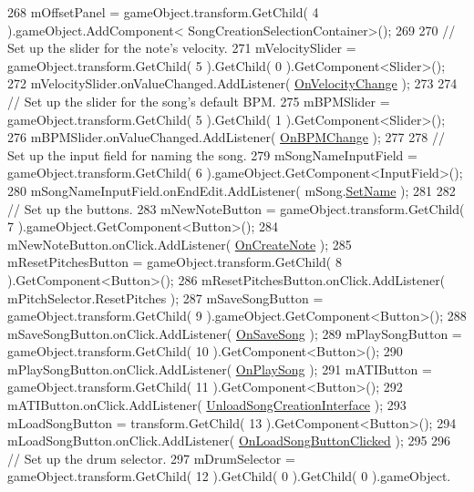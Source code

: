 \begin{DoxyCodeInclude}
268         mOffsetPanel = gameObject.transform.GetChild( 4 ).gameObject.AddComponent<
      SongCreationSelectionContainer>();
269 
270         \textcolor{comment}{// Set up the slider for the note's velocity.}
271         mVelocitySlider = gameObject.transform.GetChild( 5 ).GetChild( 0 ).GetComponent<Slider>();
272         mVelocitySlider.onValueChanged.AddListener( \hyperlink{group___s_c_m_handlers_ga45e79bb31be34e3e2cc47bd6a6563b40}{OnVelocityChange} );
273 
274         \textcolor{comment}{// Set up the slider for the song's default BPM.}
275         mBPMSlider = gameObject.transform.GetChild( 5 ).GetChild( 1 ).GetComponent<Slider>();
276         mBPMSlider.onValueChanged.AddListener( \hyperlink{group___s_c_m_handlers_gae5930497314c77bd9c52c083b2f3e82e}{OnBPMChange} );
277 
278         \textcolor{comment}{// Set up the input field for naming the song.        }
279         mSongNameInputField = gameObject.transform.GetChild( 6 ).gameObject.GetComponent<InputField>();
280         mSongNameInputField.onEndEdit.AddListener( mSong.\hyperlink{group___song_pub_func_gacb01510cf72657fc7c64bb6ba00c2c56}{SetName} );
281 
282         \textcolor{comment}{// Set up the buttons.}
283         mNewNoteButton = gameObject.transform.GetChild( 7 ).gameObject.GetComponent<Button>();
284         mNewNoteButton.onClick.AddListener( \hyperlink{group___s_c_m_handlers_gaed512eb78e060a40616e6e31ce029440}{OnCreateNote} );
285         mResetPitchesButton = gameObject.transform.GetChild( 8 ).GetComponent<Button>();
286         mResetPitchesButton.onClick.AddListener( mPitchSelector.ResetPitches );
287         mSaveSongButton = gameObject.transform.GetChild( 9 ).gameObject.GetComponent<Button>();
288         mSaveSongButton.onClick.AddListener( \hyperlink{group___s_c_m_handlers_gafd5e9f72e7a15cb77994c59fbbf8b769}{OnSaveSong} );
289         mPlaySongButton = gameObject.transform.GetChild( 10 ).GetComponent<Button>();
290         mPlaySongButton.onClick.AddListener( \hyperlink{group___s_c_m_handlers_gafb394a0b00c8f9c0959d901faf9131c7}{OnPlaySong} );
291         mATIButton = gameObject.transform.GetChild( 11 ).GetComponent<Button>();
292         mATIButton.onClick.AddListener( \hyperlink{group___s_c_m_handlers_gac39b0d849c680dda1e047c3e7d848b51}{UnloadSongCreationInterface} );
293         mLoadSongButton = transform.GetChild( 13 ).GetComponent<Button>();
294         mLoadSongButton.onClick.AddListener( \hyperlink{group___s_c_m_handlers_ga1747d021ddb36a8c2c172315d6fbb3a8}{OnLoadSongButtonClicked} );
295 
296         \textcolor{comment}{// Set up the drum selector.}
297         mDrumSelector = gameObject.transform.GetChild( 12 ).GetChild( 0 ).GetChild( 0 ).gameObject.

\end{DoxyCodeInclude}
